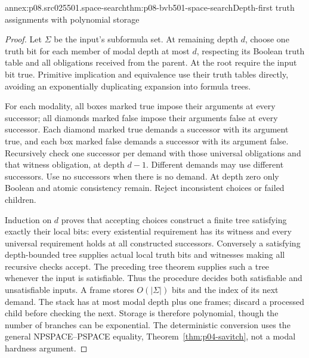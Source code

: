 \begin{annexitem}{annex:p08.src025501.space-search}{thm:p08-bvb501-space-search}{Depth-first truth assignments with polynomial storage}
\begin{proof}
Let \(\Sigma\) be the input's subformula set. At remaining depth
\(d\), choose one truth bit for each member of modal depth at most
\(d\), respecting its Boolean truth table and all obligations
received from the parent. At the root require the input bit true.
Primitive implication and equivalence use their truth tables directly,
avoiding an exponentially duplicating expansion into formula trees.

For each modality, all boxes marked true impose their arguments at
every successor; all diamonds marked false impose their arguments
false at every successor. Each diamond marked true demands a successor
with its argument true, and each box marked false demands a successor
with its argument false. Recursively check one successor per demand
with those universal obligations and that witness obligation, at depth
\(d-1\). Different demands may use different successors. Use no
successors when there is no demand. At depth zero only Boolean and
atomic consistency remain. Reject inconsistent choices or failed children.

Induction on \(d\) proves that accepting choices construct a finite
tree satisfying exactly their local bits: every existential requirement
has its witness and every universal requirement holds at all constructed
successors. Conversely a satisfying depth-bounded tree supplies actual
local truth bits and witnesses making all recursive checks accept.
The preceding tree theorem supplies such a tree whenever the input
is satisfiable. Thus the procedure decides both satisfiable and
unsatisfiable inputs. A frame stores \(O(|\Sigma|)\) bits and the
index of its next demand. The stack has at most modal depth plus one
frames; discard a processed child before checking the next. Storage is
therefore polynomial, though the number of branches can be exponential.
The deterministic conversion uses the general NPSPACE--PSPACE equality,
Theorem~\ref{thm:p04-savitch}, not a modal hardness argument.
\end{proof}
\end{annexitem}

